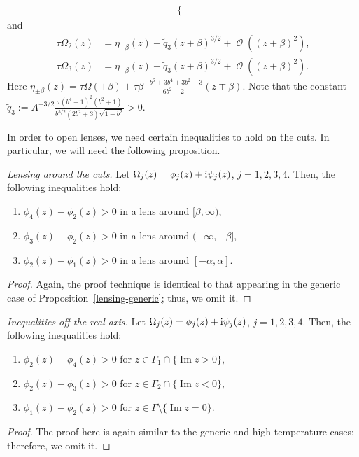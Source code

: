 \documentclass[10pt,a4paper]{amsart}
\DeclareMathOperator{\OO}{\mathcal{O}}
\numberwithin{equation}{section}
\begin{document}
\begin{prop}
\begin{enumerate}
\begin{align}
\begin{cases}
 \end{cases}
 \end{align}
 and
 \begin{align}
 \tau\Omega_2(z) &= \eta_{-\beta}(z) + \tilde{q}_3 (z +\beta)^{3/2} + \OO( (z+\beta)^2 ),\\
 \tau\Omega_3(z) &= \eta_{-\beta}(z) - \tilde{q}_3 (z +\beta)^{3/2} + \OO( (z+\beta)^2 ).
 \end{align}
 Here $\eta_{ \pm \beta}(z) = \tau \Omega(\pm \beta) \pm \tau \beta \frac{-b^6 + 3b^4 + 3b^2 + 3}{6b^2 + 2} (z\mp \beta)$.
 Note that the constant $\tilde{q}_3 := A^{-3/2}\frac{\tau (b^4-1)^2(b^2+1)}{b^{5/2}(2b^2 + 3)\sqrt{1-b^2}} >0$.
 \end{enumerate}
\end{prop}
In order to open lenses, we need certain inequalities to hold on the cuts. In particular, we will need the following proposition.
 \begin{prop}
 \textit{Lensing around the cuts.}
 Let $\Omega_j(z) = \phi_j(z) + {\rm i}\psi_j(z)$, $j= 1,2,3,4$. Then, the following inequalities hold:
 \begin{enumerate}\itemsep=0pt
 \item $\phi_4(z) - \phi_2(z) > 0$ in a lens around $[\beta,\infty)$,
 \item $\phi_3(z) - \phi_2(z) > 0$ in a lens around $(-\infty,-\beta]$,
 \item $\phi_2(z) - \phi_1(z) > 0$ in a lens around $[-\alpha,\alpha]$.
 \end{enumerate}
 \end{prop}
\begin{proof}
 Again, the proof technique is identical to that appearing in the generic case of Proposition~\ref{lensing-generic}; thus, we omit it.
\end{proof}

\begin{prop}
 \textit{Inequalities off the real axis.}
 Let $\Omega_j(z) = \phi_j(z) + {\rm i}\psi_j(z)$, $j = 1,2,3,4$. Then, the following inequalities hold:
 \begin{enumerate}\itemsep=0pt
 \item $\phi_2(z) - \phi_4(z) > 0$ for $z \in \Gamma_1 \cap \{\operatorname{Im} z > 0\}$,
 \item $\phi_2(z) - \phi_3(z) > 0$ for $z \in \Gamma_2 \cap \{\operatorname{Im} z < 0\}$,
 \item $\phi_1(z) - \phi_2(z) > 0$ for $z \in \Gamma \setminus \{\operatorname{Im} z = 0\}$.
 \end{enumerate}
\end{prop}
\begin{proof}
 The proof here is again similar to the generic and high temperature cases; therefore, we omit it.
\end{proof}
\end{document}
